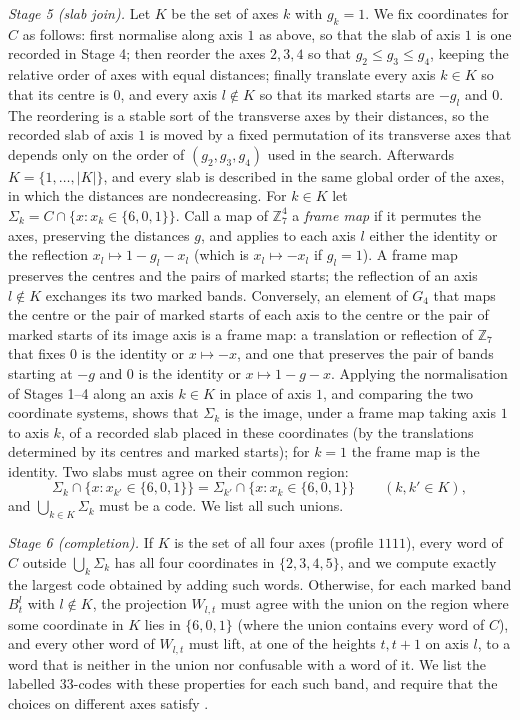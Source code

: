 \documentclass[11pt,colorlinks]{charlie}
\newcommand{\Zs}{\mathbb{Z}_7}
\begin{document}
\emph{Stage 5 (slab join).} Let $K$ be the set of axes $k$ with $g_k=1$. We fix coordinates for $C$ as follows: first normalise along axis $1$ as above, so that the slab of axis $1$ is one recorded in Stage 4; then reorder the axes $2,3,4$ so that $g_2\le g_3\le g_4$, keeping the relative order of axes with equal distances; finally translate every axis $k\in K$ so that its centre is $0$, and every axis $l\notin K$ so that its marked starts are $-g_l$ and $0$. The reordering is a stable sort of the transverse axes by their distances, so the recorded slab of axis $1$ is moved by a fixed permutation of its transverse axes that depends only on the order of $(g_2,g_3,g_4)$ used in the search. Afterwards $K=\{1,\dots,|K|\}$, and every slab is described in the same global order of the axes, in which the distances are nondecreasing. For $k\in K$ let $\Sigma_k=C\cap\{x:x_k\in\{6,0,1\}\}$. Call a map of $\Zs^4$ a \emph{frame map} if it permutes the axes, preserving the distances $g$, and applies to each axis $l$ either the identity or the reflection $x_l\mapsto1-g_l-x_l$ (which is $x_l\mapsto-x_l$ if $g_l=1$). A frame map preserves the centres and the pairs of marked starts; the reflection of an axis $l\notin K$ exchanges its two marked bands. Conversely, an element of $G_4$ that maps the centre or the pair of marked starts of each axis to the centre or the pair of marked starts of its image axis is a frame map: a translation or reflection of $\Zs$ that fixes $0$ is the identity or $x\mapsto-x$, and one that preserves the pair of bands starting at $-g$ and $0$ is the identity or $x\mapsto1-g-x$. Applying the normalisation of Stages 1--4 along an axis $k\in K$ in place of axis $1$, and comparing the two coordinate systems, shows that $\Sigma_k$ is the image, under a frame map taking axis $1$ to axis $k$, of a recorded slab placed in these coordinates (by the translations determined by its centres and marked starts); for $k=1$ the frame map is the identity. Two slabs must agree on their common region:
\[
 \Sigma_k\cap\{x:x_{k'}\in\{6,0,1\}\}=\Sigma_{k'}\cap\{x:x_k\in\{6,0,1\}\}\qquad(k,k'\in K),
\]
and $\bigcup_{k\in K}\Sigma_k$ must be a code. We list all such unions.

\emph{Stage 6 (completion).} If $K$ is the set of all four axes (profile $1111$), every word of $C$ outside $\bigcup_k\Sigma_k$ has all four coordinates in $\{2,3,4,5\}$, and we compute exactly the largest code obtained by adding such words. Otherwise, for each marked band $B^l_t$ with $l\notin K$, the projection $W_{l,t}$ must agree with the union on the region where some coordinate in $K$ lies in $\{6,0,1\}$ (where the union contains every word of $C$), and every other word of $W_{l,t}$ must lift, at one of the heights $t,t+1$ on axis $l$, to a word that is neither in the union nor confusable with a word of it. We list the labelled $33$-codes with these properties for each such band, and require that the choices on different axes satisfy .
\end{document}
